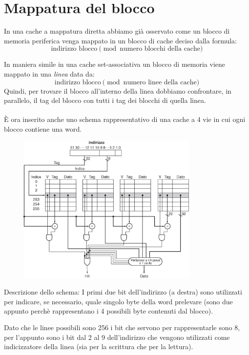 \documentclass[class=book, crop=false, oneside]{standalone}
\begin{document}
\section{Mappatura del blocco}
In una cache a mappatura diretta abbiamo già osservato come un blocco di memoria periferica venga mappato in un blocco di cache deciso dalla formula:
\begin{equation*}
	\textrm{indirizzo blocco} \pmod{\textrm{numero blocchi della cache}}
\end{equation*}

In maniera simile in una cache set-associativa un blocco di memoria viene mappato in una \emph{linea} data da:
\begin{equation*}
	\textrm{indirizzo blocco} \pmod{\textrm{numero linee della cache}}
\end{equation*}
Quindi, per trovare il blocco all’interno della linea dobbiamo confrontare, in parallelo, il tag del blocco con tutti i tag dei blocchi di quella linea.
\\
\\
È ora inserito anche uno schema rappresentativo di una cache a 4 vie in cui ogni blocco contiene una word.

\begin{figure}[!h]
	\centering
	\includegraphics[width=0.8\textwidth,keepaspectratio]{4-vie}
\end{figure}

Descrizione dello schema:
I primi due bit dell'indirizzo (a destra) sono utilizzati per indicare, se necessario, quale singolo byte della word prelevare (sono due appunto perchè rappresentano i 4 possibili byte contenuti dal blocco).

Dato che le linee possibili sono 256 i bit che servono per rappresentarle sono 8, per l'appunto sono i bit dal 2 al 9 dell'indirizzo che vengono utilizzati come indicizzatore della linea (sia per la scrittura che per la lettura).
\end{document}
